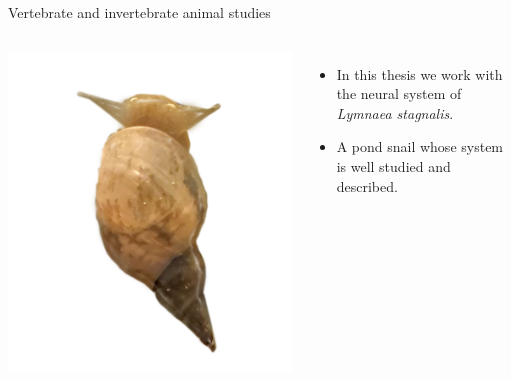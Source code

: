 \documentclass[aspectratio=43]{beamer}
\begin{document}
\begin{frame}{Vertebrate and invertebrate animal studies}

		\begin{columns}[t]
			\includegraphics[width=\linewidth]{intro/lymnaea.png}
			
			\vspace{-4cm} %
			\begin{itemize}
				\item<1->In this thesis we work with the neural system of \textit{Lymnaea stagnalis}.
				\item<2>A pond snail whose system is well studied and described.
			\end{itemize}
		\end{columns}
	
\end{frame}
\end{document}
